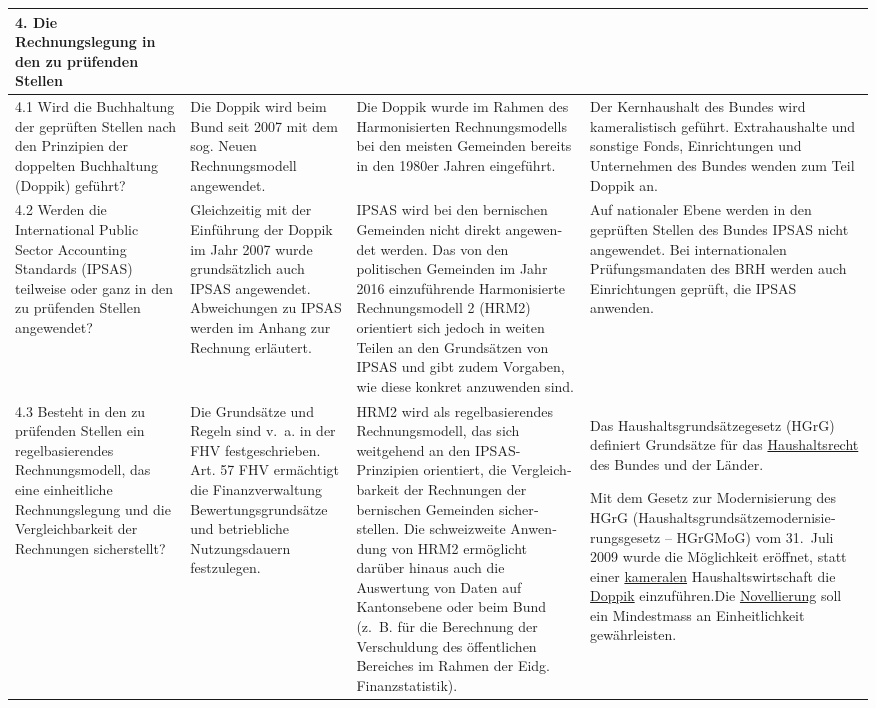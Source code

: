 \documentclass[10pt]{article}
\begin{document}
\begin{landscape}
\begin{center}
\begin{longtable}{|p{4cm}|p{5cm}|p{7.5cm}|p{7.5cm}|}
 \\
\hline
\textbf{4. Die Rechnungslegung in den zu prüfenden Stellen} &  &  &  \\
\hline
4.1 Wird die Buchhaltung der geprüften Stellen nach den Prinzipien der doppelten Buchhaltung (Doppik) geführt? & Die Doppik wird beim Bund seit 2007 mit dem sog. Neuen Rechnungsmodell angewendet. & Die Doppik wurde im Rahmen des Harmonisierten Rechnungsmodells bei den meisten Gemeinden bereits in den 1980er Jahren eingeführt. & Der Kernhaushalt des Bundes wird kameralistisch geführt. Extrahaushalte und sonstige Fonds, Einrichtungen und Unternehmen des Bundes wenden zum Teil Doppik an. \\
\hline
4.2 Werden die International Public Sector Accounting Standards (IPSAS) teilweise oder ganz in den zu prüfenden Stellen angewendet? & Gleichzeitig mit der Einführung der Doppik im Jahr 2007 wurde grundsätzlich auch IPSAS angewendet. Abweichungen zu IPSAS werden im Anhang zur Rechnung erläutert. & IPSAS wird bei den bernischen Gemeinden nicht direkt angewen­det werden. Das von den politischen Gemeinden im Jahr 2016 einzuführende Harmonisierte Rechnungsmodell 2 (HRM2) orientiert sich jedoch in weiten Teilen an den Grundsätzen von IPSAS und gibt zudem Vorgaben, wie diese konkret anzuwenden sind. & Auf nationaler Ebene werden in den geprüften Stellen des Bundes IPSAS nicht angewendet. Bei internationalen Prüfungsmandaten des BRH werden auch Einrichtungen geprüft, die IPSAS anwenden.

 \\
\hline
4.3 Besteht in den zu prüfenden Stellen ein regelbasierendes Rechnungsmodell, das eine einheitliche Rechnungslegung und die Vergleichbarkeit der Rechnungen sicherstellt? & Die Grundsätze und Regeln sind v.~a. in der FHV festgeschrieben. Art. 57 FHV ermächtigt die Finanzverwaltung Bewertungs­grundsätze und betriebliche Nutzungsdauern festzulegen. & HRM2 wird als regelbasierendes Rechnungsmodell, das sich weitgehend an den IPSAS-Prinzipien orientiert, die Vergleich­barkeit der Rechnungen der bernischen Gemeinden sicher­stellen. Die schweizweite Anwen­dung von HRM2 ermöglicht darüber hinaus auch die Auswertung von Daten auf Kantonsebene oder beim Bund (z.~B. für die Berechnung der Verschuldung des öffentlichen Bereiches im Rahmen der Eidg. Finanzstatistik). & Das Haushaltsgrundsätzegesetz (HGrG) definiert Grundsätze für das \href{https://de.wikipedia.org/wiki/Haushaltsrecht}{Haushaltsrecht} des Bundes und der Länder.

Mit dem Gesetz zur Modernisierung des HGrG (Haushaltsgrundsätzemodernisie­rungsgesetz -- HGrGMoG) vom 31.~Juli 2009 wurde die Möglichkeit eröffnet, statt einer \href{https://de.wikipedia.org/wiki/Kameralistik}{kameralen} Haushaltswirtschaft die \href{https://de.wikipedia.org/wiki/Doppik}{Doppik} einzuführen.Die \href{https://de.wikipedia.org/wiki/Novellierung}{Novellierung} soll ein Mindestmass an Einheitlichkeit gewährleisten.


\end{longtable}
\end{center}
\end{landscape}
\end{document}
